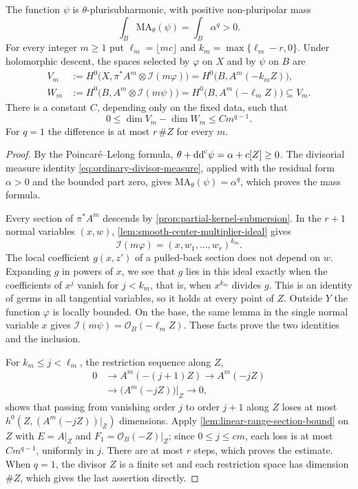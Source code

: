 \begin{theorem}\label{thm:horizontal-center-descent}
The function $\psi$ is $\theta$-plurisubharmonic, with positive non-pluripolar mass
\[
 \int_B\mathrm{MA}_\theta(\psi)=\int_B\alpha^q>0.
\]
For every integer $m\geq1$ put $\ell_m=\lfloor mc\rfloor$ and $k_m=\max\{\ell_m-r,0\}$. Under holomorphic descent, the spaces selected by $\varphi$ on $X$ and by $\psi$ on $B$ are
\[
 \begin{split}
 V_m&:=H^0\bigl(X,\pi^*A^m\otimes\mathcal I(m\varphi)\bigr)
       =H^0\bigl(B,A^m(-k_m Z)\bigr),\\
 W_m&:=H^0\bigl(B,A^m\otimes\mathcal I(m\psi)\bigr)
       =H^0\bigl(B,A^m(-\ell_m Z)\bigr)\subseteq V_m.
 \end{split}
\]
There is a constant $C$, depending only on the fixed data, such that
\[
 0\leq\dim V_m-\dim W_m\leq Cm^{q-1}.
\]
For $q=1$ the difference is at most $r\,\#Z$ for every $m$.
\end{theorem}
\begin{proof}
By the Poincar\'e--Lelong formula, $\theta+\mathrm{dd}^{\mathrm{c}}\psi=\alpha+c[Z]\geq0$. The divisorial measure identity \eqref{eq:ordinary-divisor-measure}, applied with the residual form $\alpha>0$ and the bounded part zero, gives $\mathrm{MA}_\theta(\psi)=\alpha^q$, which proves the mass formula.

Every section of $\pi^*A^m$ descends by \cref{prop:partial-kernel-submersion}. In the $r+1$ normal variables $(x,w)$, \cref{lem:smooth-center-multiplier-ideal} gives
\[
 \mathcal I(m\varphi)=(x,w_1,\ldots,w_r)^{k_m}.
\]
The local coefficient $g(x,z')$ of a pulled-back section does not depend on $w$. Expanding $g$ in powers of $x$, we see that $g$ lies in this ideal exactly when the coefficients of $x^j$ vanish for $j<k_m$, that is, when $x^{k_m}$ divides $g$. This is an identity of germs in all tangential variables, so it holds at every point of $Z$. Outside $Y$ the function $\varphi$ is locally bounded. On the base, the same lemma in the single normal variable $x$ gives $\mathcal I(m\psi)=\mathcal O_B(-\ell_mZ)$. These facts prove the two identities and the inclusion.

For $k_m\leq j<\ell_m$, the restriction sequence along $Z$,
\[
 \begin{split}
 0&\longrightarrow A^m(-(j+1)Z)\longrightarrow A^m(-jZ)\\
  &\longrightarrow \bigl(A^m(-jZ)\bigr)|_Z\longrightarrow0,
 \end{split}
\]
shows that passing from vanishing order $j$ to order $j+1$ along $Z$ loses at most $h^0(Z,(A^m(-jZ))|_Z)$ dimensions. Apply \cref{lem:linear-range-section-bound} on $Z$ with $E=A|_Z$ and $F_1=\mathcal O_B(-Z)|_Z$; since $0\leq j\leq cm$, each loss is at most $Cm^{q-1}$, uniformly in $j$. There are at most $r$ steps, which proves the estimate. When $q=1$, the divisor $Z$ is a finite set and each restriction space has dimension $\#Z$, which gives the last assertion directly.
\end{proof}

